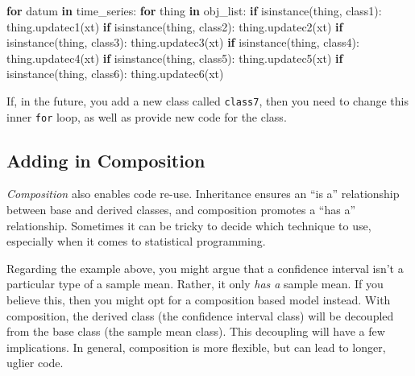 \documentclass[
  12pt,
]{krantz}
\makeatletter
\newenvironment{Shaded}{\begin{snugshade}}{\end{snugshade}}
\newcommand{\BuiltInTok}[1]{#1}
\newcommand{\ControlFlowTok}[1]{\textcolor[rgb]{0.27,0.27,0.27}{\textbf{#1}}}
\newcommand{\KeywordTok}[1]{\textcolor[rgb]{0.27,0.27,0.27}{\textbf{#1}}}
\newcommand{\NormalTok}[1]{#1}
\newenvironment{kframe}{%
\medskip{}
\setlength{\fboxsep}{.8em}
 \def\at@end@of@kframe{}%
 \ifinner\ifhmode%
  \def\at@end@of@kframe{\end{minipage}}%
  \begin{minipage}{\columnwidth}%
 \fi\fi%
 \def\FrameCommand##1{\hskip\@totalleftmargin \hskip-\fboxsep
 \colorbox{shadecolor}{##1}\hskip-\fboxsep
     \hskip-\linewidth \hskip-\@totalleftmargin \hskip\columnwidth}%
 \MakeFramed {\advance\hsize-\width
   \@totalleftmargin\z@ \linewidth\hsize
   \@setminipage}}%
 {\par\unskip\endMakeFramed%
 \at@end@of@kframe}
\renewenvironment{Shaded}{\begin{kframe}}{\end{kframe}}
\makeatother
\begin{document}
\begin{Shaded}
\begin{Highlighting}[]
\ControlFlowTok{for}\NormalTok{ datum }\KeywordTok{in}\NormalTok{ time\_series:}
  \ControlFlowTok{for}\NormalTok{ thing }\KeywordTok{in}\NormalTok{ obj\_list:}
    \ControlFlowTok{if} \BuiltInTok{isinstance}\NormalTok{(thing, class1):}
\NormalTok{      thing.updatec1(xt)}
    \ControlFlowTok{if} \BuiltInTok{isinstance}\NormalTok{(thing, class2):}
\NormalTok{      thing.updatec2(xt)}
    \ControlFlowTok{if} \BuiltInTok{isinstance}\NormalTok{(thing, class3):}
\NormalTok{      thing.updatec3(xt)}
    \ControlFlowTok{if} \BuiltInTok{isinstance}\NormalTok{(thing, class4):}
\NormalTok{      thing.updatec4(xt)}
    \ControlFlowTok{if} \BuiltInTok{isinstance}\NormalTok{(thing, class5):}
\NormalTok{      thing.updatec5(xt)}
    \ControlFlowTok{if} \BuiltInTok{isinstance}\NormalTok{(thing, class6):}
\NormalTok{      thing.updatec6(xt)}
\end{Highlighting}
\end{Shaded}

If, in the future, you add a new class called \texttt{class7}, then you need to change this inner \texttt{for} loop, as well as provide new code for the class.

\hypertarget{adding-in-composition}{%
\subsection{Adding in Composition}\label{adding-in-composition}}

\emph{Composition} also enables code re-use. Inheritance ensures an ``is a'' relationship between base and derived classes, and composition promotes a ``has a'' relationship. Sometimes it can be tricky to decide which technique to use, especially when it comes to statistical programming.

Regarding the example above, you might argue that a confidence interval isn't a particular type of a sample mean. Rather, it only \emph{has a} sample mean. If you believe this, then you might opt for a composition based model instead. With composition, the derived class (the confidence interval class) will be decoupled from the base class (the sample mean class). This decoupling will have a few implications. In general, composition is more flexible, but can lead to longer, uglier code.
\end{document}
